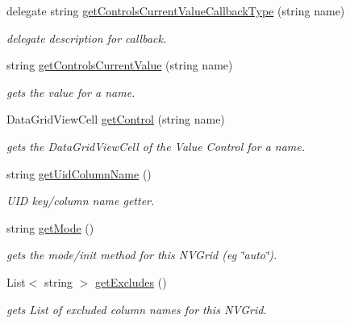 \begin{DoxyCompactItemize}
delegate string \hyperlink{class_ias_pbx_config_1_1_name_value_grid_a3d9ca74d6c6ede38ee0e947b2a78d2c1}{getControlsCurrentValueCallbackType} (string name)
\begin{DoxyCompactList}\small\item\em delegate description for callback. \item\end{DoxyCompactList}\item 
string \hyperlink{class_ias_pbx_config_1_1_name_value_grid_ade71f1670c36b0b421cd4b0812f6aa5f}{getControlsCurrentValue} (string name)
\begin{DoxyCompactList}\small\item\em gets the value for a name. \item\end{DoxyCompactList}\item 
DataGridViewCell \hyperlink{class_ias_pbx_config_1_1_name_value_grid_a9aa3b69e7ca463cb1cb900e25c904712}{getControl} (string name)
\begin{DoxyCompactList}\small\item\em gets the DataGridViewCell of the Value Control for a name. \item\end{DoxyCompactList}\item 
string \hyperlink{class_ias_pbx_config_1_1_name_value_grid_a9074cc4353c1d1d39d78d67f2db36c70}{getUidColumnName} ()
\begin{DoxyCompactList}\small\item\em UID key/column name getter. \item\end{DoxyCompactList}\item 
string \hyperlink{class_ias_pbx_config_1_1_name_value_grid_a1ec8a16694d06cb32dfd0874c762e41c}{getMode} ()
\begin{DoxyCompactList}\small\item\em gets the mode/init method for this NVGrid (eg \char`\"{}auto\char`\"{}). \item\end{DoxyCompactList}\item 
List$<$ string $>$ \hyperlink{class_ias_pbx_config_1_1_name_value_grid_ac00f102d1ab5b370a866b09b4855594c}{getExcludes} ()
\begin{DoxyCompactList}\small\item\em gets List of excluded column names for this NVGrid. \item\end{DoxyCompactList}\end{DoxyCompactItemize}
